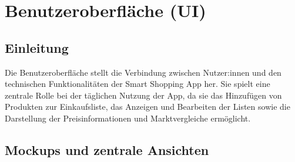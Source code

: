 \chapter{Benutzeroberfläche (UI)}
\renewcommand{\authorinitials}{NK}
\label{chap:ui}

\section{Einleitung}
Die Benutzeroberfläche stellt die Verbindung zwischen Nutzer:innen und den technischen Funktionalitäten der Smart Shopping App her. Sie spielt eine zentrale Rolle bei der täglichen Nutzung der App, da sie das Hinzufügen von Produkten zur Einkaufsliste, das Anzeigen und Bearbeiten der Listen sowie die Darstellung der Preisinformationen und Marktvergleiche ermöglicht.

\section{Mockups und zentrale Ansichten}


